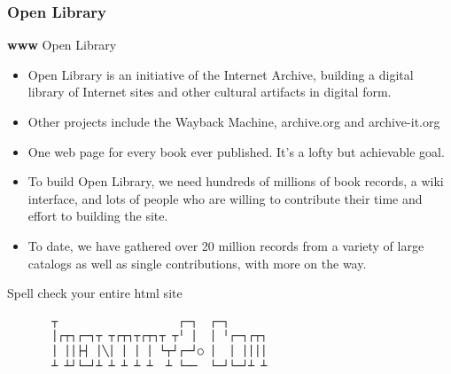 \documentclass[
]{article}
\begin{document}
\subsubsection{Open Library}

\textbf{www} Open Library

\begin{itemize}
\item
  Open Library is an initiative of the Internet Archive, building a
  digital library of Internet sites and other cultural artifacts in
  digital form.
\item
  Other projects include the Wayback Machine, archive.org and
  archive-it.org
\item
  One web page for every book ever published. It's a lofty but
  achievable goal.
\item
  To build Open Library, we need hundreds of millions of book records, a
  wiki interface, and lots of people who are willing to contribute their
  time and effort to building the site.
\item
  To date, we have gathered over 20 million records from a variety of
  large catalogs as well as single contributions, with more on the way.
\end{itemize}

Spell check your entire html site

\begin{verbatim}
       ┬                   ┌─┐  ┌─┐        
       │┌┬┐┌─┐┬ ┬┌┬┐┬┌┬┐┬ ┬╵ │  │ ╵┌─┐┌┬┐  
       │ ││├┤ │╲│ │ │ │ └┬┘┌─┘○ │  │ ││││  
       ┴ ┴┘└─┘┴ ┴ ┴ ┴ ┴  ┴ └──  └─┘└─┘┴ ┴   
\end{verbatim}
\end{document}
